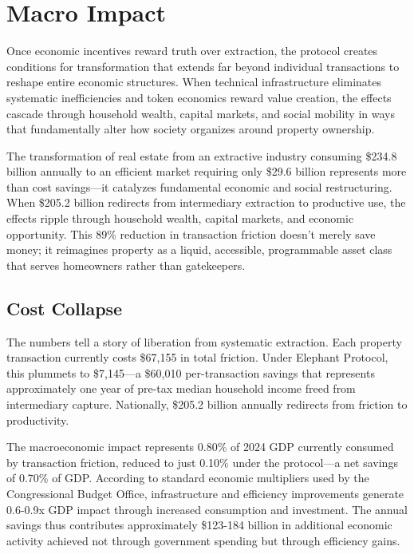 \chapter{Macro Impact}

Once economic incentives reward truth over extraction, the protocol creates conditions for transformation that extends far beyond individual transactions to reshape entire economic structures. When technical infrastructure eliminates systematic inefficiencies and token economics reward value creation, the effects cascade through household wealth, capital markets, and social mobility in ways that fundamentally alter how society organizes around property ownership.

The transformation of real estate from an extractive industry consuming \$234.8 billion annually to an efficient market requiring only \$29.6 billion represents more than cost savings---it catalyzes fundamental economic and social restructuring. When \$205.2 billion redirects from intermediary extraction to productive use, the effects ripple through household wealth, capital markets, and economic opportunity. This 89\% reduction in transaction friction doesn't merely save money; it reimagines property as a liquid, accessible, programmable asset class that serves homeowners rather than gatekeepers.

\section{Cost Collapse}

The numbers tell a story of liberation from systematic extraction. Each property transaction currently costs \$67,155 in total friction. Under Elephant Protocol, this plummets to \$7,145---a \$60,010 per-transaction savings that represents approximately one year of pre-tax median household income freed from intermediary capture. Nationally, \$205.2 billion annually redirects from friction to productivity.

The macroeconomic impact represents 0.80\% of 2024 GDP currently consumed by transaction friction, reduced to just 0.10\% under the protocol---a net savings of 0.70\% of GDP. According to standard economic multipliers used by the Congressional Budget Office, infrastructure and efficiency improvements generate 0.6-0.9x GDP impact through increased consumption and investment. The annual savings thus contributes approximately \$123-184 billion in additional economic activity achieved not through government spending but through efficiency gains.


